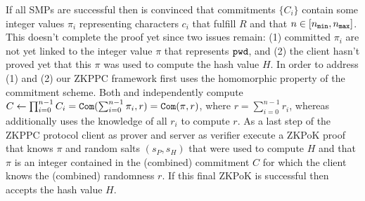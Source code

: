 If all SMPs are successful then \Server is convinced that commitments $\{C_i\}$ contain some integer values $\pi_i$ representing characters $c_i$ that fulfill $R$ and that $n\in[{n_\mathtt{min}},{n_\mathtt{max}}]$. This doesn't complete the proof yet since two issues remain:  (1) committed $\pi_i$ are not yet linked to the integer value $\pi$ that represents $\mathtt{pwd}$, and (2) the client hasn't proved yet that this $\pi$ was used to compute the hash value $H$. In order to address (1) and (2) our \ac{ZKPPC} framework first uses the homomorphic property of the commitment scheme. Both \Client and \Server independently compute $C\gets\prod_{i=0}^{n-1}C_i=\mathtt{Com}(\sum_{i=0}^{n-1} \pi_i,r)= \mathtt{Com}(\pi, r)$, where $r = \sum_{i=0}^{n-1} r_i$, whereas \Client additionally uses the knowledge of all $r_i$ to compute $r$. As a last step of the \ac{ZKPPC} protocol client \Client as prover and server \Server as verifier execute a ZKPoK proof that \Client knows $\pi$ and random salts $(s_P, s_H)$ that were used to compute $H$ and that $\pi$ is an integer contained in the (combined) commitment $C$ for which the client knows the (combined) randomness $r$. If this final ZKPoK is successful then \Server accepts the hash value $H$.



